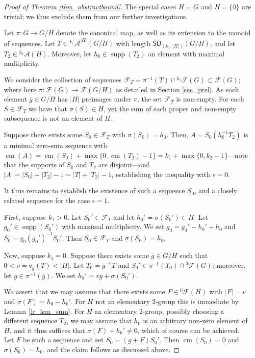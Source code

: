 \documentclass{amsart}
\theoremstyle{definition}
\numberwithin{equation}{section}
\begin{document}
\begin{proof}[Proof of Theorem \ref{thm_abstractbound}]
The special cases $H=G$ and $H=\{0\}$ are trivial; we thus exclude them from our further investigations.

Let $\pi : G \to G/H$ denote the canonical map, as well as its extension to the monoid of sequences.
Let $T \in {{}^{{k_1}}\!\mathcal{A}}^{|H|} (G/H)$ with length ${\mathsf{SD}}_{(k_1,|H|)}(G/H)$,
and let $T_2 \in {{}^{{k_2}}\!\mathcal{A}}(H)$. Moreover, let $h_0\in \operatorname{supp}( T_2)$ an element with maximal multiplicity.

We consider the collection of sequences ${{}^{{}}\!\mathcal{F}}_T=\pi^{-1}(T)\cap {{}^{{k_1}}\!\mathcal{F}}(G) \subset {{}^{{}}\!\mathcal{F}}(G)$; where here $\pi: {{}^{{}}\!\mathcal{F}}(G)\to {{}^{{}}\!\mathcal{F}}(G/H)$ as detailed in Section \ref{sec_prel}.
As each element $\overline{g} \in G/H$ has $|H|$ preimages under $\pi$, the set
${{}^{{}}\!\mathcal{F}}_T$ is non-empty.
For each $S \in {{}^{{}}\!\mathcal{F}}_T$ we have that $\sigma(S) \in H$, yet the sum of each proper and non-empty subsequence
is not an element of $H$.

Suppose there exists some $S_0 \in {{}^{{}}\!\mathcal{F}}_T$ with $\sigma(S_0)=h_0$.
Then, $A=S_0(h_0^{-1}T_2)$ is a minimal zero-sum sequence with $\operatorname{cm}(A)= \operatorname{cm}(S_0)+ \max \{0,\operatorname{cm}(T_2)-1\}=k_1 + \max\{0,k_2-1\}$---note that the supports of $S_0$ and $T_2$ are disjoint---and $|A|= |S_0| + |T_2|-1 = |T| + |T_2|-1$, establishing the inequality with $\epsilon=0$.

It thus remains to establish the existence of such a sequence $S_0$, and a closely related sequence for the case
$\epsilon = 1$.

First, suppose $k_1>0$.
Let $S_0' \in {{}^{{}}\!\mathcal{F}}_T$ and let $h_0' = \sigma(S_0')\in H$.
Let $g_0'\in \operatorname{supp}(S_0')$ with maximal multiplicity.
We set $g_0 = g_0' - h_0' + h_0$ and $S_0= g_0(g_0')^{-1}S_0'$.
Then $S_0 \in {{}^{{}}\!\mathcal{F}}_T$ and $\sigma(S_0)=h_0$.

Now, suppose $k_1=0$.  Suppose there exists some $\overline{g} \in G/H$ such
that $0 < v=\mathsf{v}_{\overline{g}}(T)< |H|$.
Let $T_0=\overline{g}^{-v}T$ and $S_0' \in \pi^{-1}(T_0)\cap {{}^{{0}}\!\mathcal{F}}(G)$; moreover, let $g \in \pi^{-1}(\overline{g})$.
We set $h_0'= vg + \sigma(S_0')$.

We assert that we may assume that there exists some $F \in {{}^{{0}}\!\mathcal{F}}(H)$ with $|F|=v$ and $\sigma(F)= h_0-h_0'$.
For $H$ not an elementary $2$-group this is immediate by Lemma \ref{lr_lem_sum}.
For $H$ an elementary $2$-group, possibly choosing a different sequence $T_2$, we may assume that $h_0$ is an arbitrary non-zero element of $H$, and it thus suffices that $\sigma(F)+h_0' \neq 0$, which
of course can be achieved.
Let $F$ be such a sequence and set $S_0=(g+ F)S_0'$. Then $\operatorname{cm}(S_0)= 0$ and $\sigma(S_0)= h_0$, and the claim follows as discussed above.


\end{proof}
\end{document}
